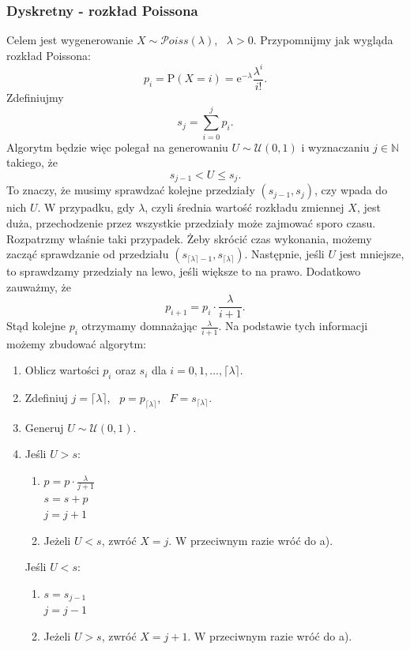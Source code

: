 \documentclass[12pt]{mwrep}
\begin{document}
	\subsubsection{Dyskretny - rozkład Poissona}
	\noindent Celem jest wygenerowanie $X \sim \mathcal{P}oiss(\lambda)$, \ $\lambda > 0$. Przypomnijmy jak wygląda rozkład \mbox{Poissona}:
	$$ p_i = \mathrm{P}(X = i) = \mathrm{e}^{-\lambda} \frac{\lambda^i}{i!}. $$
	Zdefiniujmy
	$$ s_j = \sum\limits_{i=0}^{j} p_i. $$
	Algorytm będzie więc polegał na generowaniu $U \sim \mathcal{U}(0, 1)$ i wyznaczaniu $j \in \mathbb{N} $ takiego, że 
	$$ s_{j -1} < U \leqslant s_j. $$
	To znaczy, że musimy sprawdzać kolejne przedziały $(s_{j-1}, s_j)$, czy wpada do nich $U$. W przypadku, gdy $\lambda$, czyli średnia wartość rozkładu zmiennej $X$, jest duża, przechodzenie przez wszystkie przedziały może zajmować sporo czasu. Rozpatrzmy właśnie taki przypadek. Żeby skrócić czas wykonania, możemy zacząć sprawdzanie od przedziału $ (s_{\lceil \lambda \rceil -1}, s_{\lceil \lambda \rceil}) $. Następnie, jeśli $U$ jest mniejsze, to sprawdzamy przedziały na lewo, jeśli większe to na prawo. Dodatkowo zauważmy, że
	$$ p_{i + 1} = p_i \cdot \frac{\lambda}{i + 1}. $$
	Stąd kolejne $p_i$ otrzymamy domnażając $\frac{\lambda}{i + 1}$. Na podstawie tych informacji możemy zbudować algorytm:
	\begin{enumerate}[leftmargin=10mm]
		\item Oblicz wartości $p_i$ oraz $s_i$ dla $i = 0, 1, \dots, \lceil\lambda\rceil$.
		\item Zdefiniuj $j = \lceil \lambda \rceil$, \ $p = p_{\lceil\lambda\rceil}$, \ $F = s_{\lceil\lambda\rceil}$.
		\item Generuj $U \sim \mathcal{U}(0, 1)$.
		\item Jeśli $U > s$:
		\begin{enumerate}[leftmargin=10mm]
			\item $p = p \cdot \frac{\lambda}{j+1}$\\
			$s = s + p$\\
			$j = j + 1$
			\item Jeżeli $U < s$, zwróć $X = j$. W przeciwnym razie wróć do a).
		\end{enumerate}
		Jeśli $U < s$:
		\begin{enumerate}[leftmargin=10mm]
			\item $s = s_{j-1}$\\
			$j = j - 1$
			\item Jeżeli $U > s$, zwróć $X = j + 1$. W przeciwnym razie wróć do a).
		\end{enumerate}
	\end{enumerate}
	
\end{document}
